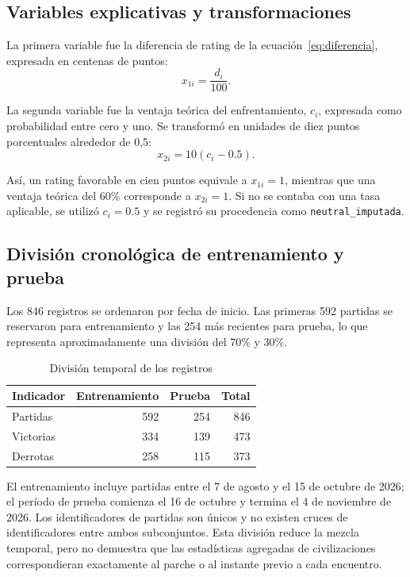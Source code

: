 \documentclass[12pt,a4paper]{article}
\begin{document}
\subsection{Variables explicativas y transformaciones}

La primera variable fue la diferencia de rating de la ecuación~\eqref{eq:diferencia}, expresada en centenas de puntos:
\begin{equation}
x_{1i}=\frac{d_i}{100}.
\end{equation}

La segunda variable fue la ventaja teórica del enfrentamiento, $c_i$, expresada como probabilidad entre cero y uno. Se transformó en unidades de diez puntos porcentuales alrededor de 0,5:
\begin{equation}
x_{2i}=10(c_i-0.5).
\end{equation}

Así, un rating favorable en cien puntos equivale a $x_{1i}=1$, mientras que una ventaja teórica del 60\% corresponde a $x_{2i}=1$. Si no se contaba con una tasa aplicable, se utilizó $c_i=0.5$ y se registró su procedencia como \texttt{neutral\_imputada}.

\subsection{División cronológica de entrenamiento y prueba}

Los 846 registros se ordenaron por fecha de inicio. Las primeras 592 partidas se reservaron para entrenamiento y las 254 más recientes para prueba, lo que representa aproximadamente una división del 70\% y 30\%.

\begin{table}[htbp]
\centering
\caption{División temporal de los registros}
\label{tab:split}
\begin{tabular}{lrrr}
\toprule
\textbf{Indicador} & \textbf{Entrenamiento} & \textbf{Prueba} & \textbf{Total}\\
\midrule
Partidas & 592 & 254 & 846\\
Victorias & 334 & 139 & 473\\
Derrotas & 258 & 115 & 373\\
\bottomrule
\end{tabular}
\end{table}

El entrenamiento incluye partidas entre el 7 de agosto y el 15 de octubre de 2026; el período de prueba comienza el 16 de octubre y termina el 4 de noviembre de 2026. Los identificadores de partidas son únicos y no existen cruces de identificadores entre ambos subconjuntos. Esta división reduce la mezcla temporal, pero no demuestra que las estadísticas agregadas de civilizaciones correspondieran exactamente al parche o al instante previo a cada encuentro.
\end{document}
